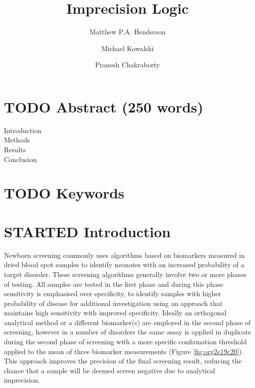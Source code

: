 \documentclass[review]{elsarticle}
\date{}
\title{}
\begin{document}
\makeatletter
\newcommand{\citeprocitem}[2]{\hyper@linkstart{cite}{citeproc_bib_item_#1}#2\hyper@linkend}
\makeatother



\begin{frontmatter}
\title{Imprecision Logic}
\author[NSO, UoO]{Matthew P.A. Henderson}
\author[NSO]{Michael Kowalski}
\author[NSO, UO]{Pranesh Chakraborty}
\address[NSO]{Newborn Screening Ontario, Children's Hospital of Eastern Ontario,Canada}
\address[UoO]{Department of Medicine, University of Ottawa,Canada} 
\end{frontmatter}

\section*{{\bfseries\sffamily TODO} Abstract (250 words)}
\label{sec:orge2a3966}
\begin{description}
\item[{Introduction}] 

\item[{Methods}] 

\item[{Results}] 

\item[{Conclusion}] 
\end{description}
\section*{{\bfseries\sffamily TODO} Keywords}
\label{sec:orgf553669}
\section*{{\bfseries\sffamily STARTED} Introduction}
\label{sec:orgc014789}

Newborn screening commonly uses algorithms based on biomarkers
measured in dried blood spot samples to identify neonates with an
increased probability of a target disorder. These screening
algorithms generally involve two or more phases of testing. All
samples are tested in the first phase and during this phase
sensitivity is emphasised over specificity, to identify samples with
higher probability of disease for additional investigation using an
approach that maintains high sensitivity with improved
specificity. Ideally an orthogonal analytical method or a different
biomarker(s) are employed in the second phase of screening, however in
a number of disorders the same assay is applied in duplicate during
the second phase of screening with a more specific confirmation
threshold applied to the mean of three biomarker measurements (Figure
\ref{fig:org2e19c20}). This approach improves the precision of the final
screening result, reducing the chance that a sample will be deemed
screen negative due to analytical imprecision.
\end{document}
